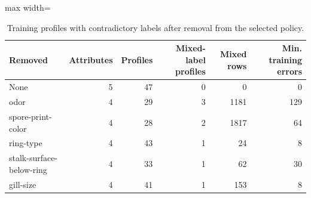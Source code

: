\begin{table}[H]
\centering\small
\caption{Training profiles with contradictory labels after removal from the selected policy.}
\begin{adjustbox}{max width=\linewidth}\begin{tabular}{lrrrrr}
\toprule
Removed & Attributes & Profiles & Mixed-label profiles & Mixed rows & Min. training errors \\
\midrule
None & 5 & 47 & 0 & 0 & 0 \\
odor & 4 & 29 & 3 & 1181 & 129 \\
spore-print-color & 4 & 28 & 2 & 1817 & 64 \\
ring-type & 4 & 43 & 1 & 24 & 8 \\
stalk-surface-below-ring & 4 & 33 & 1 & 62 & 30 \\
gill-size & 4 & 41 & 1 & 153 & 8 \\
\bottomrule
\end{tabular}\end{adjustbox}
\end{table}
